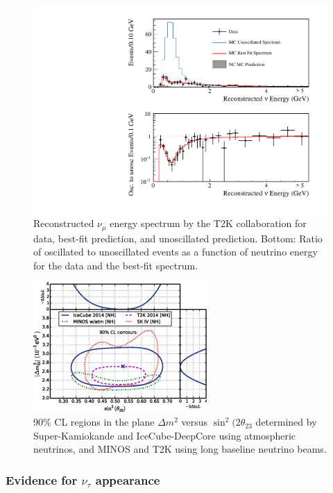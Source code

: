 \documentclass[preprint,12pt]{elsarticle}
\begin{document}
\begin{figure}[htbp]
\centering
\includegraphics[width=0.6\linewidth]{figures/t2k-disapp.pdf}
  \caption{
Reconstructed $\nu_\mu$ energy spectrum by the T2K collaboration for data, best-fit prediction, and
unoscillated prediction. Bottom: Ratio of oscillated to unoscillated events as a function of
neutrino energy for the data and the best-fit spectrum.
}
 \label{fig:t2kdis}
 \end{figure}

\begin{figure}[htbp]
\centering
\includegraphics[width=0.6\linewidth]{figures/atm-contour.pdf}
  \caption{
  90\% CL regions in the plane $\Delta m^2 $ versus $\sin^2 (2 \theta_{23}$
  determined by Super-Kamiokande and IceCube-DeepCore using atmospheric neutrinos, and MINOS and T2K using long baseline neutrino beams. 
}
 \label{fig:atm-contour}
 \end{figure}




\subsubsection{Evidence for $\nu_\tau$ appearance}
\end{document}
